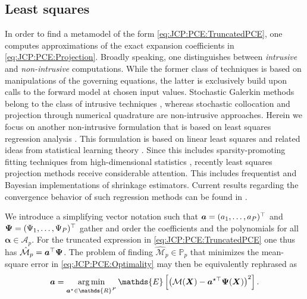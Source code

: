 \subsection{Least squares}
In order to find a metamodel of the form \cref{eq:JCP:PCE:TruncatedPCE}, one computes approximations of the exact expansion coefficients in \cref{eq:JCP:PCE:Projection}.
Broadly speaking, one distinguishes between \emph{intrusive} and \emph{non-intrusive} computations.
While the former class of techniques is based on manipulations of the governing equations, the latter is exclusively build upon calls to the forward model at chosen input values.
Stochastic Galerkin methods belong to the class of intrusive techniques \cite{PCE:Babuska2004,PCE:Xiu2009:b},
whereas stochastic collocation \cite{PCE:Xiu2005,PCE:Xiu2007} and projection through numerical quadrature \cite{PCE:LeMaitre2001,PCE:LeMaitre2002} are non-intrusive approaches.
Herein we focus on another non-intrusive formulation that is based on least squares regression analysis \cite{PCE:Berveiller2006,PCE:Blatman2008}.
This formulation is based on linear least squares \cite{Statistics:Lawson1995,Statistics:Bjorck1996}
and related ideas from statistical learning theory \cite{Statistics:Vapnik2000,Statistics:Hastie2009}.
Since this includes sparsity-promoting fitting techniques from high-dimensional statistics \cite{Statistics:Giraud2015,Statistics:Hastie2015},
recently least squares projection methods receive considerable attention.
This includes frequentist \cite{PCE:Blatman2011,PCE:Doostan2011,PCE:Yan2012,PCE:Mathelin2012}
and Bayesian implementations \cite{PCE:Sargsyan2014,PCE:Ray2015,PCE:Karagiannis2014,PCE:Karagiannis2015} of shrinkage estimators.
Current results regarding the convergence behavior of such regression methods can be found in \cite{PCE:Cohen2013,PCE:Migliorati2014,PCE:Chkifa2015}.
\par %
We introduce a simplifying vector notation such that \(\bm{a} = (a_1,\ldots,a_P)^\top\) and
\(\bm{\Psi} = (\Psi_1,\ldots,\Psi_P)^\top\) gather and order the coefficients and the polynomials for all \(\bm{\alpha} \in \mathcal{A}_p\).
For the truncated expression in \cref{eq:JCP:PCE:TruncatedPCE} one thus has \(\hat{\mathcal{M}}_p = \bm{a}^\top \bm{\Psi}\).
The problem of finding \(\hat{\mathcal{M}}_p \in \mathds{P}_p\) that minimizes the mean-square error in \cref{eq:JCP:PCE:Optimality} may then be equivalently rephrased as
\begin{equation} \label{eq:JCP:PCE:Minimization}
  \bm{\coeffM} = \operatorname*{arg\,min}_{\bm{\coeffM}^\star \in \mathds{R}^P} \mathds{E} \left[ \left( \mathcal{M}(\bm{X}) - \bm{\coeffM}^{\star\top} \bm{\basis}(\bm{X}) \right)^2 \right].
\end{equation}
